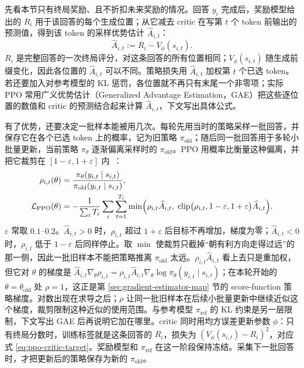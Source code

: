 先看本节只有终局奖励、且不折扣未来奖励的情况。回答 \(y_i\) 完成后，奖励模型给出的 \(R_i\) 用于该回答的每个生成位置；从它减去 critic 在写第 \(t\) 个 token 前输出的预测值，得到该 token 的采样优势估计 \(\widehat A_{i,t}\)：
\begin{equation}
 \widehat A_{i,t}:=R_i-V_\phi(s_{i,t}).
 \label{eq:ppo-terminal-advantage}
\end{equation}
\(R_i\) 是完整回答的一次终局评分，对这条回答的所有位置相同；\(V_\phi(s_{i,t})\) 随生成前缀变化，因此各位置的 \(\widehat A_{i,t}\) 可以不同。策略损失用 \(\widehat A_{i,t}\) 加权第 \(t\) 个已选 token。若还要加入对参考模型的 KL 惩罚，各位置就不再只有末尾一个非零项；实际 PPO 常用广义优势估计（Generalized Advantage Estimation，GAE）把这些逐位置的数值和 critic 的预测结合起来计算 \(\widehat A_{i,t}\)，下文写出具体公式。

有了优势，还要决定一批样本能被用几次。每轮先用当时的策略采样一批回答，并保存它在各个已选 token 上的概率，记为旧策略 \(\pi_{\mathrm{old}}\)；随后同一批回答用于多轮小批量更新，当前策略 \(\pi_\theta\) 逐渐偏离采样时的 \(\pi_{\mathrm{old}}\)。PPO 用概率比衡量这种偏离，并把它裁剪在 \([1-\varepsilon,1+\varepsilon]\) 内~\cite{schulman2017ppo}：
\begin{equation}
\begin{aligned}
 \rho_{i,t}(\theta)&=\frac{\pi_\theta(y_{i,t}\mid s_{i,t})}{\pi_{\mathrm{old}}(y_{i,t}\mid s_{i,t})},\\
 \mathcal L_{\mathrm{PPO}}(\theta)
 &=-\frac{1}{\sum_iT_i}\sum_{i}\sum_{t=1}^{T_i}
 \min\Bigl(\rho_{i,t}\widehat A_{i,t},\;
 \operatorname{clip}\bigl(\rho_{i,t},1-\varepsilon,1+\varepsilon\bigr)\widehat A_{i,t}\Bigr).
\end{aligned}
 \label{eq:ppo-clip}
\end{equation}
\(\varepsilon\) 常取 \(0.1\)--\(0.2\)。\(\widehat A_{i,t}>0\) 时，\(\rho_{i,t}\) 超过 \(1+\varepsilon\) 后目标不再增加，梯度为零；\(\widehat A_{i,t}<0\) 时，\(\rho_{i,t}\) 低于 \(1-\varepsilon\) 后同样停止。取 \(\min\) 使裁剪只截掉“朝有利方向走得过远”的那一侧，因此一批旧样本不能把策略推离 \(\pi_{\mathrm{old}}\) 太远。\(\rho_{i,t}\widehat A_{i,t}\) 看上去只是重加权，但它对 \(\theta\) 的梯度是 \(\widehat A_{i,t}\nabla_\theta\rho_{i,t}=\rho_{i,t}\widehat A_{i,t}\nabla_\theta\log\pi_\theta(y_{i,t}\mid s_{i,t})\)；在本轮开始的 \(\theta=\theta_{\mathrm{old}}\) 处 \(\rho=1\)，这正是第 \ref{sec:gradient-estimator-map} 节的 score-function 策略梯度。对数出现在求导之后；\(\rho\) 让同一批旧样本在后续小批量更新中继续近似这个梯度，裁剪限制这种近似的使用范围。与参考模型 \(\pi_{\mathrm{ref}}\) 的 KL 约束是另一层限制，下文写出 GAE 后再说明它加在哪里。critic 同时用均方误差更新参数 \(\phi\)：只有终局分数时，训练标签就是这条回答的 \(R_i\)，损失为 \((V_\phi(s_{i,t})-R_i)^2\)，对应式 \eqref{eq:ppo-critic-target}。奖励模型和 \(\pi_{\mathrm{ref}}\) 在这一阶段保持冻结。采集下一批回答时，才把更新后的策略保存为新的 \(\pi_{\mathrm{old}}\)。

